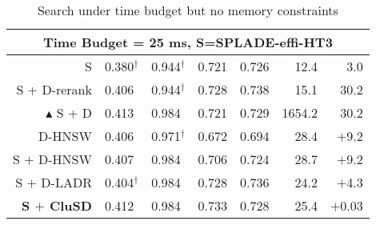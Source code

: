 \begin{table}[htbp]
{\begin{tabular}{r |llll|rr}
       \hline       
            \multicolumn{7}{c}{\bf{Time Budget = 25 ms, S=SPLADE-effi-HT3}}\\
            \hline
            S& 0.380$^\dag$& 0.944$^\dag$& 0.721 &  0.726 & 12.4 & 3.0 \\
             S + D-rerank & 0.406 & 0.944$^\dag$& 0.728 & 0.738 & 15.1 & 30.2 \\
            $\blacktriangle$  S + D & 0.413 & 0.984 & 0.721 &0.729 & 1654.2& 30.2  \\
            \hline
            D-HNSW & 0.406 & 0.971$^\dag$& 0.672 & 0.694 & 28.4 & $+$9.2\\
             S $+$ D-HNSW & 0.407 & 0.984 & 0.706 & 0.724 & 28.7 & $+$9.2\\
            S $+$ D-LADR & 0.404$^\dag$& 0.984 & 0.728 &  0.736 & 24.2 & $+$4.3\\
            \bf S $+$ CluSD & 0.412 & 0.984 & 0.733 & 0.728 & 25.4 & $+$0.03\\
			\hline\hline
		\end{tabular}  }
	\caption{Search under time budget but  no memory constraints 
}
  \vspace*{-10mm}
	\label{tab:maintime}
\end{table}




